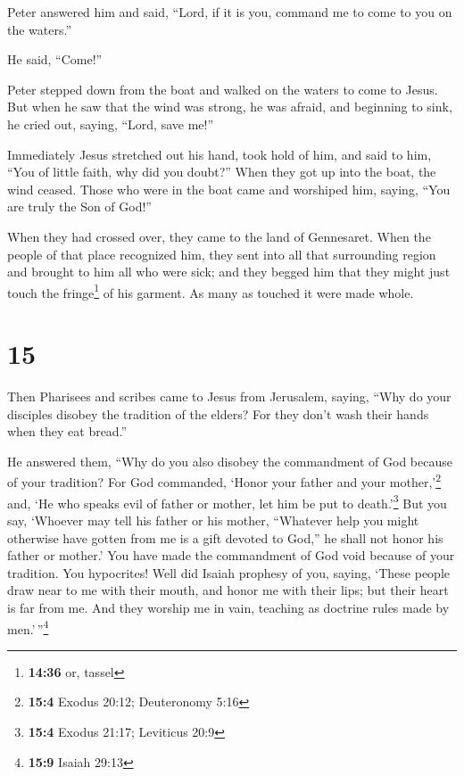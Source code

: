  Peter answered him and said, ``Lord, if it is you,
command me to come to you on the waters.''

 He said, ``Come!''

Peter stepped down from the boat and walked on the waters to come to
Jesus.  But when he saw that the wind was strong, he was
afraid, and beginning to sink, he cried out, saying, ``Lord, save me!''

 Immediately Jesus stretched out his hand, took hold of
him, and said to him, ``You of little faith, why did you doubt?''
 When they got up into the boat, the wind ceased.
 Those who were in the boat came and worshiped him,
saying, ``You are truly the Son of God!''

 When they had crossed over, they came to the land of
Gennesaret.  When the people of that place recognized
him, they sent into all that surrounding region and brought to him all
who were sick;  and they begged him that they might just
touch the fringe\footnote{\textbf{14:36} or, tassel} of his garment. As
many as touched it were made whole.

\hypertarget{section-14}{%
\section{15}\label{section-14}}

 Then Pharisees and scribes came to Jesus from Jerusalem,
saying,  ``Why do your disciples disobey the tradition of
the elders? For they don't wash their hands when they eat bread.''

 He answered them, ``Why do you also disobey the
commandment of God because of your tradition?  For God
commanded, `Honor your father and your mother,'\footnote{\textbf{15:4}
  Exodus 20:12; Deuteronomy 5:16} and, `He who speaks evil of father or
mother, let him be put to death.'\footnote{\textbf{15:4} Exodus 21:17;
  Leviticus 20:9}  But you say, `Whoever may tell his
father or his mother, ``Whatever help you might otherwise have gotten
from me is a gift devoted to God,''  he shall not honor
his father or mother.' You have made the commandment of God void because
of your tradition.  You hypocrites! Well did Isaiah
prophesy of you, saying,  `These people draw near to me
with their mouth, and honor me with their lips; but their heart is far
from me.  And they worship me in vain, teaching as
doctrine rules made by men.'\,''\footnote{\textbf{15:9} Isaiah 29:13}

